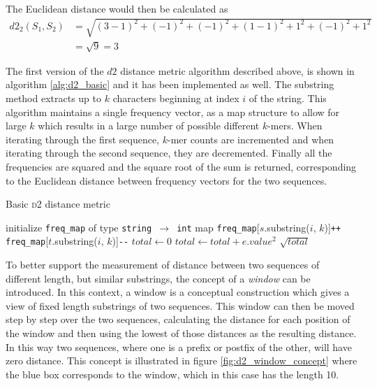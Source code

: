 The Euclidean distance would then be calculated as
\begin{align*}
  d2_2(S_1, S_2)
    &= \sqrt{(3-1)^2 + (-1)^2 + (-1)^2 + (1-1)^2 + 1^2 + (-1)^2 + 1^2} \\
    &= \sqrt{9} = 3
\end{align*}

The first version of the $d2$ distance metric algorithm described above, is
shown in algorithm \ref{alg:d2_basic} and it has been implemented as well. The
substring method extracts up to $k$ characters beginning at index $i$ of the
string. This algorithm maintains a single frequency vector, as a map structure
to allow for large $k$ which results in a large number of possible different
$k$-mers. When iterating through the first sequence, $k$-mer counts are
incremented and when iterating through the second sequence, they are
decremented. Finally all the frequencies are squared and the square root of the
sum is returned, corresponding to the Euclidean distance between frequency
vectors for the two sequences.

\begin{algorithm}
  \caption{Basic \textsc{d2} distance metric}
  \label{alg:d2_basic}
  \begin{algorithmic}[1]
    \Statex
      \State initialize \texttt{freq\_map} of type \texttt{string $\to$ int} map
        \State \texttt{freq\_map}[$s$.substring($i$, $k$)]\texttt{++}
      \EndFor
        \State \texttt{freq\_map}[$t$.substring($i$, $k$)]\texttt{-{}-}
      \EndFor
      \State $total \gets 0$
        \State $total \gets total + e.value^2$
      \EndFor
      \State \Return $\sqrt{total}$
    \EndFunction
  \end{algorithmic}
\end{algorithm}

To better support the measurement of distance between two sequences of
different length, but similar substrings, the concept of a \emph{window} can be
introduced. In this context, a window is a conceptual construction which gives
a view of fixed length substrings of two sequences. This window can then be
moved step by step over the two sequences, calculating the distance for each
position of the window and then using the lowest of those distances as the
resulting distance. In this way two sequences, where one is a prefix or postfix
of the other, will have zero distance. This concept is illustrated in figure
\ref{fig:d2_window_concept} where the blue box corresponds to the window, which
in this case has the length 10.


